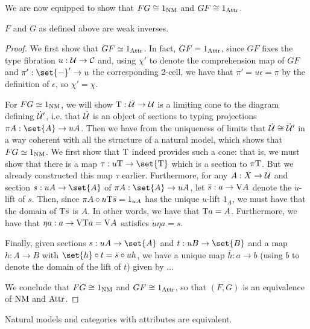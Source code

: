 \documentclass[../thesis.tex]{subfiles}
\begin{document}
We are now equipped to show that $FG \cong 1_{\mathrm{NM}}$ and $GF \cong 1_{\mathrm{Attr}}$.
\begin{theorem}
  $F$ and $G$ as defined above are weak inverses.
\end{theorem}
\begin{proof}
  We first show that $GF \simeq 1_{\mathrm{Attr}}$. In fact, $GF = 1_{\mathrm{Attr}}$, since $GF$ fixes the type fibration $u : {\mathcal{U}} \to {\mathcal{C}}$ and,
  using $\chi'$ to denote the comprehension map of $GF$ and $\pi' : \set{-}' \to u$ the corresponding 2-cell, we have that
  $\pi' = u\epsilon = \pi$ by the definition of $\epsilon$, so $\chi' = \chi$. 
  
  For $FG \simeq 1_{\mathrm{NM}}$, we will show ${{\mathrm{T}}} : \dot{{\mathcal{U}}} \to {\mathcal{U}}$ is a limiting cone to the diagram defining $\dot{{\mathcal{U}}}'$, i.e. that
  $\dot{{\mathcal{U}}}$ is an object of sections to typing projections $\pi A : \set{A} \to uA$. Then we have from the uniqueness of limits
  that $\dot{{\mathcal{U}}} \cong \dot{{\mathcal{U}}}'$ in a way coherent with all the structure of a natural model, which shows that $FG \simeq 1_{\mathrm{NM}}$.
  We first show that ${{\mathrm{T}}}$ indeed provides such a cone: that is, we must show that there is a map $\tau : u\typ \to \set{\typ}$
  which is a section to $\pi{{\mathrm{T}}}$. But we already constructed this map $\tau$ earlier. Furthermore, for any $A : X \to {\mathcal{U}}$ and
  section $s : uA \to \set{A}$ of $\pi A : \set{A} \to uA$, let $\bar s : a \to {{\mathrm{V}}} A$ denote the $\dot u$-lift of $s$. Then,
  since $\pi A \circ u{{\mathrm{T}}} \bar s = 1_{uA}$ has the unique $u$-lift $1_A$, we must have that the domain of ${{\mathrm{T}}}\bar s$ is $A$.
  In other words, we have that ${{\mathrm{T}}} a = A$. Furthermore, we have that $\eta a : a \to {{\mathrm{V}}}{{\mathrm{T}}} a = {{\mathrm{V}}} A$ satisfies
   $\dot u \eta a = s$.
  
  Finally, given sections $s : uA \to \set{A}$ and $t : uB \to \set{B}$ and a map $h : A \to B$ with $\set{h} \circ t =
  s \circ uh$, we have a unique map $\bar h : a \to b$ (using $b$ to denote the domain of the lift of $t$) given by
   ...


  We conclude that $FG \cong 1_{\mathrm{NM}}$ and $GF \cong 1_{\mathrm{Attr}}$, so that $(F,G)$ is an equivalence of ${\mathrm{NM}}$ and ${\mathrm{Attr}}$.
\end{proof}

\begin{corollary}
  Natural models and categories with attributes are equivalent.
\end{corollary}
\end{document}
